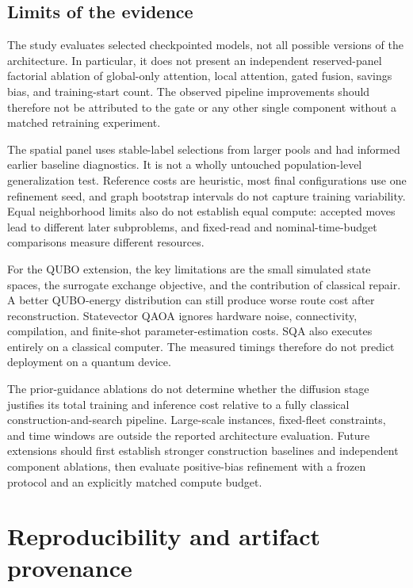 \documentclass[11pt,a4paper]{article}
\begin{document}
\subsection{Limits of the evidence}

The study evaluates selected checkpointed models, not all possible versions
of the architecture. In particular, it does not present an independent
reserved-panel factorial ablation of global-only attention, local attention,
gated fusion, savings bias, and training-start count. The observed pipeline
improvements should therefore not be attributed to the gate or any other
single component without a matched retraining experiment.

The spatial panel uses stable-label selections from larger pools and had
informed earlier baseline diagnostics. It is not a wholly untouched
population-level generalization test. Reference costs are heuristic, most
final configurations use one refinement seed, and graph bootstrap intervals
do not capture training variability. Equal neighborhood limits also do not
establish equal compute: accepted moves lead to different later subproblems,
and fixed-read and nominal-time-budget comparisons measure different
resources.

For the QUBO extension, the key limitations are the small simulated state
spaces, the surrogate exchange objective, and the contribution of classical
repair. A better QUBO-energy distribution can still produce worse route
cost after reconstruction. Statevector QAOA ignores hardware noise,
connectivity, compilation, and finite-shot parameter-estimation costs.
SQA also executes entirely on a classical computer. The measured timings
therefore do not predict deployment on a quantum device.

The prior-guidance ablations do not determine whether the diffusion stage
justifies its total training and inference cost relative to a fully
classical construction-and-search pipeline. Large-scale instances,
fixed-fleet constraints, and time windows are outside the reported
architecture evaluation. Future extensions should first establish stronger
construction baselines and independent component ablations, then evaluate
positive-bias refinement with a frozen protocol and an explicitly matched
compute budget.

\section{Reproducibility and artifact provenance}
\label{sec:reproducibility}
\end{document}
